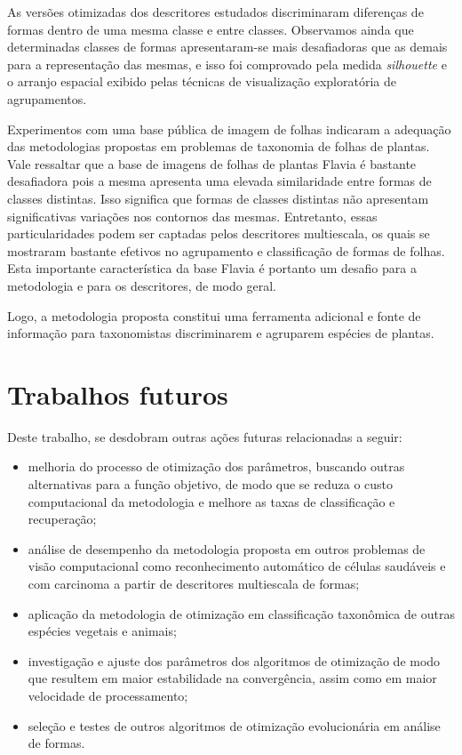 As versões otimizadas dos descritores estudados discriminaram diferenças de formas dentro de uma mesma classe e entre classes. Observamos ainda que determinadas classes de formas apresentaram-se mais desafiadoras que as demais para a representação das mesmas, e isso foi comprovado pela medida \textit{silhouette}  e o arranjo espacial exibido pelas técnicas de visualização exploratória de agrupamentos.

Experimentos com uma base pública de imagem de folhas indicaram a adequação das metodologias propostas em problemas de taxonomia de folhas de plantas. Vale ressaltar que a base de imagens de folhas de plantas Flavia é bastante desafiadora pois a mesma apresenta uma elevada similaridade entre formas de classes distintas. Isso significa que formas de classes distintas não apresentam significativas variações nos contornos das mesmas. Entretanto, essas particularidades podem ser captadas pelos descritores multiescala, os quais se mostraram bastante efetivos no agrupamento e classificação de formas de folhas.
Esta importante característica da base Flavia é portanto um desafio para a metodologia e  para os descritores, de modo geral. 

Logo, a metodologia proposta constitui uma ferramenta adicional e fonte de informação para taxonomistas discriminarem e agruparem espécies de plantas. 


\section*{Trabalhos futuros}
Deste trabalho, se desdobram outras ações futuras relacionadas a seguir: 
\begin{itemize}

\item melhoria do processo de otimização dos parâmetros, buscando outras alternativas para a função objetivo, de modo que se reduza o custo computacional da metodologia e melhore as taxas de classificação e recuperação;

\item análise de desempenho da metodologia proposta em outros problemas de visão computacional como reconhecimento automático de células saudáveis e com carcinoma a partir de descritores multiescala de formas;

\item aplicação da metodologia de otimização em classificação taxonômica de outras espécies vegetais e animais;

\item investigação e ajuste dos parâmetros dos algoritmos de otimização de modo que resultem em maior estabilidade na convergência, assim como em maior velocidade de processamento;

\item seleção e testes de outros algoritmos de otimização evolucionária em análise  de formas.

\end{itemize}

